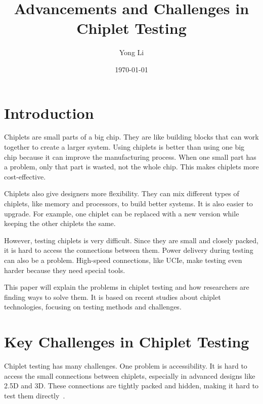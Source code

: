 \documentclass[acmtog, 12pt]{acmart}
\date{\today}
\begin{document}
\title{Advancements and Challenges in Chiplet Testing}

\author{Yong Li}


\renewcommand{\shortauthors}{Yong Li}


    
    
\maketitle


\section*{Introduction}

Chiplets are small parts of a big chip. They are like building blocks that can work together to create a larger system. Using chiplets is better than using one big chip because it can improve the manufacturing process. When one small part has a problem, only that part is wasted, not the whole chip. This makes chiplets more cost-effective.

Chiplets also give designers more flexibility. They can mix different types of chiplets, like memory and processors, to build better systems. It is also easier to upgrade. For example, one chiplet can be replaced with a new version while keeping the other chiplets the same.

However, testing chiplets is very difficult. Since they are small and closely packed, it is hard to access the connections between them. Power delivery during testing can also be a problem. High-speed connections, like UCIe, make testing even harder because they need special tools.

This paper will explain the problems in chiplet testing and how researchers are finding ways to solve them. It is based on recent studies about chiplet technologies, focusing on testing methods and challenges.




\section*{Key Challenges in Chiplet Testing}

Chiplet testing has many challenges. One problem is accessibility. It is hard to access the small connections between chiplets, especially in advanced designs like 2.5D and 3D. These connections are tightly packed and hidden, making it hard to test them directly~\cite{10365967}.
\end{document}
